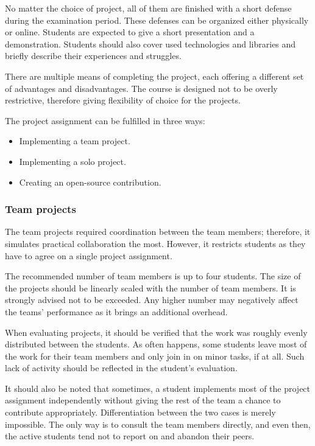 \documentclass[
  digital,
  color,
  oneside,
  nosansbold,
  nocolorbold,
  lof,
  lot,
]{fithesis4}
\begin{document}
No matter the choice of project, all of them are finished with a short defense during the examination period. These defenses can be organized either physically or online. Students are expected to give a short presentation and a demonstration. Students should also cover used technologies and libraries and briefly describe their experiences and struggles.

There are multiple means of completing the project, each offering a different set of advantages and disadvantages. The course is designed not to be overly restrictive, therefore giving flexibility of choice for the projects.

The project assignment can be fulfilled in three ways:
\begin{itemize}
 \item Implementing a team project.
 \item Implementing a solo project.
 \item Creating an open-source contribution.
\end{itemize}

\subsubsection{Team projects}

The team projects required coordination between the team members; therefore, it simulates practical collaboration the most. However, it restricts students as they have to agree on a single project assignment. 

The recommended number of team members is up to four students. The size of the projects should be linearly scaled with the number of team members. It is strongly advised not to be exceeded. Any higher number may negatively affect the teams' performance as it brings an additional overhead.

When evaluating projects, it should be verified that the work was roughly evenly distributed between the students. As often happens, some students leave most of the work for their team members and only join in on minor tasks, if at all. Such lack of activity should be reflected in the student's evaluation.

It should also be noted that sometimes, a student implements most of the project assignment independently without giving the rest of the team a chance to contribute appropriately. Differentiation between the two cases is merely impossible. The only way is to consult the team members directly, and even then, the active students tend not to report on and abandon their peers.
\end{document}
